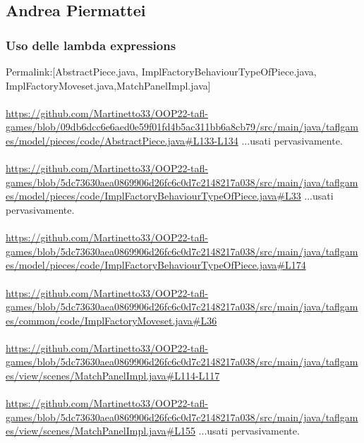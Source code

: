 \documentclass[a4paper,12pt]{report}
\begin{document}
\subsection{Andrea Piermattei}
\subsubsection{Uso delle lambda expressions}
Permalink:[AbstractPiece.java, ImplFactoryBehaviourTypeOfPiece.java, ImplFactoryMoveset.java,MatchPanelImpl.java]\\\\
\url{https://github.com/Martinetto33/OOP22-tafl-games/blob/09db6dcc6e6aed0e59f01fd4b5ac311bb6a8cb79/src/main/java/taflgames/model/pieces/code/AbstractPiece.java#L133-L134}
...usati pervasivamente.\\\\
\url{https://github.com/Martinetto33/OOP22-tafl-games/blob/5dc73630aea0869906d26fc6c0d7c2148217a038/src/main/java/taflgames/model/pieces/code/ImplFactoryBehaviourTypeOfPiece.java#L33}
...usati pervasivamente.\\\\
\url{https://github.com/Martinetto33/OOP22-tafl-games/blob/5dc73630aea0869906d26fc6c0d7c2148217a038/src/main/java/taflgames/model/pieces/code/ImplFactoryBehaviourTypeOfPiece.java#L174}\\\\
\url{https://github.com/Martinetto33/OOP22-tafl-games/blob/5dc73630aea0869906d26fc6c0d7c2148217a038/src/main/java/taflgames/common/code/ImplFactoryMoveset.java#L36}\\\\
\url{https://github.com/Martinetto33/OOP22-tafl-games/blob/5dc73630aea0869906d26fc6c0d7c2148217a038/src/main/java/taflgames/view/scenes/MatchPanelImpl.java#L114-L117}\\\\
\url{https://github.com/Martinetto33/OOP22-tafl-games/blob/5dc73630aea0869906d26fc6c0d7c2148217a038/src/main/java/taflgames/view/scenes/MatchPanelImpl.java#L155}
...usati pervasivamente.\\\\
\end{document}
